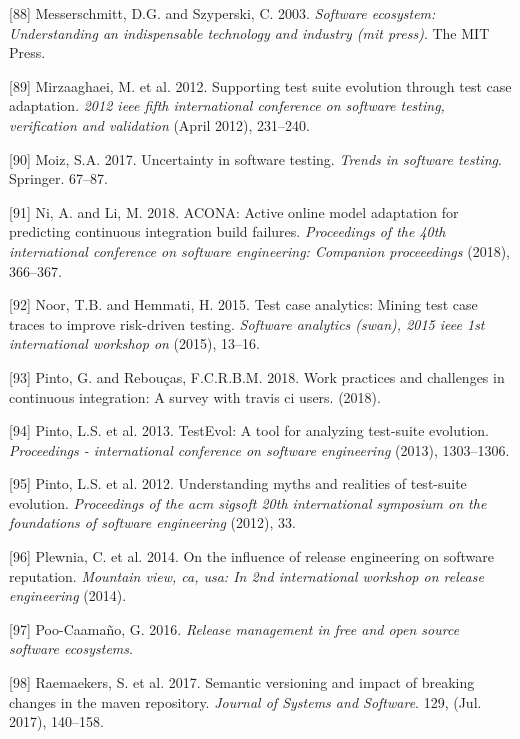\documentclass[]{book}
\begin{document}
\hypertarget{ref-Messerschmitt2003}{}
{[}88{]} Messerschmitt, D.G. and Szyperski, C. 2003. \emph{Software
ecosystem: Understanding an indispensable technology and industry (mit
press)}. The MIT Press.

\hypertarget{ref-supportingtestsuite}{}
{[}89{]} Mirzaaghaei, M. et al. 2012. Supporting test suite evolution
through test case adaptation. \emph{2012 ieee fifth international
conference on software testing, verification and validation} (April
2012), 231--240.

\hypertarget{ref-moiz2017uncertainty}{}
{[}90{]} Moiz, S.A. 2017. Uncertainty in software testing. \emph{Trends
in software testing}. Springer. 67--87.

\hypertarget{ref-ni2018acona}{}
{[}91{]} Ni, A. and Li, M. 2018. ACONA: Active online model adaptation
for predicting continuous integration build failures. \emph{Proceedings
of the 40th international conference on software engineering: Companion
proceeedings} (2018), 366--367.

\hypertarget{ref-noor2015test}{}
{[}92{]} Noor, T.B. and Hemmati, H. 2015. Test case analytics: Mining
test case traces to improve risk-driven testing. \emph{Software
analytics (swan), 2015 ieee 1st international workshop on} (2015),
13--16.

\hypertarget{ref-pinto2018work}{}
{[}93{]} Pinto, G. and Rebouças, F.C.R.B.M. 2018. Work practices and
challenges in continuous integration: A survey with travis ci users.
(2018).

\hypertarget{ref-pinto2013}{}
{[}94{]} Pinto, L.S. et al. 2013. TestEvol: A tool for analyzing
test-suite evolution. \emph{Proceedings - international conference on
software engineering} (2013), 1303--1306.

\hypertarget{ref-pinto2012understanding}{}
{[}95{]} Pinto, L.S. et al. 2012. Understanding myths and realities of
test-suite evolution. \emph{Proceedings of the acm sigsoft 20th
international symposium on the foundations of software engineering}
(2012), 33.

\hypertarget{ref-plewnia2014a}{}
{[}96{]} Plewnia, C. et al. 2014. On the influence of release
engineering on software reputation. \emph{Mountain view, ca, usa: In 2nd
international workshop on release engineering} (2014).

\hypertarget{ref-poo-caamano2016a}{}
{[}97{]} Poo-Caamaño, G. 2016. \emph{Release management in free and open
source software ecosystems}.

\hypertarget{ref-Raemaekers2017}{}
{[}98{]} Raemaekers, S. et al. 2017. Semantic versioning and impact of
breaking changes in the maven repository. \emph{Journal of Systems and
Software}. 129, (Jul. 2017), 140--158.
\end{document}
